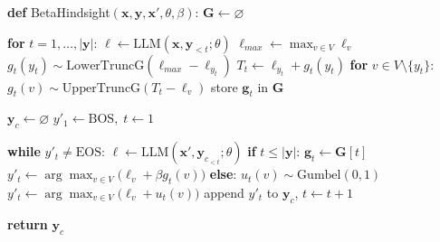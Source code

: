\begin{algorithm}[t]
\caption{$\beta$-Hindsight Control}
\label{alg:gumbel-cf-short}
\begin{algorithmic}[1]

\STATE \textbf{def} BetaHindsight$(\mathbf x, \mathbf y, \mathbf x', \theta, \beta)$:
\STATE \quad $\mathbf G \gets \varnothing$

\STATE \quad \textbf{for} $t = 1,\dots,|\mathbf y|$:
\STATE \qquad $\ell \gets \mathrm{LLM}(\mathbf x, \mathbf y_{<t};\theta)$
\STATE \qquad $\ell_{max} \gets \max_{v\in V} \ell_v$
\STATE \qquad $g_t(y_t) \sim \mathrm{LowerTruncG}(\ell_{max} - \ell_{y_t})$
\STATE \qquad $T_t \gets \ell_{y_t} + g_t(y_t)$
\STATE \qquad \textbf{for} $v \in V \setminus \{y_t\}$:
\STATE \qquad\quad $g_t(v) \sim \mathrm{UpperTruncG}(T_t - \ell_v)$
\STATE \qquad store $\mathbf g_t$ in $\mathbf G$

\STATE \quad $\mathbf y_c \gets \varnothing$
\STATE \quad $y'_1 \gets \mathrm{BOS},\; t \gets 1$

\STATE \quad \textbf{while} $y'_t \neq \mathrm{EOS}$:
\STATE \qquad $\ell \gets \mathrm{LLM}(\mathbf x', \mathbf y_{c_{<t}}; \theta)$
\STATE \qquad \textbf{if} $t \le |\mathbf y|$:
\STATE \qquad\quad $\mathbf g_t \gets \mathbf G[t]$
\STATE \qquad\quad $y'_t \gets \arg\max_{v\in V}\bigl(\ell_v + \beta g_t(v)\bigr)$
\STATE \qquad \textbf{else}:
\STATE \qquad\quad $u_t(v) \sim \mathrm{Gumbel}(0,1)$
\STATE \qquad\quad $y'_t \gets \arg\max_{v\in V}\bigl(\ell_v + u_t(v)\bigr)$
\STATE \qquad append $y'_t$ to $\mathbf y_c$, $t \gets t+1$

\STATE \quad \textbf{return} $\mathbf y_c$

\end{algorithmic}
\end{algorithm}